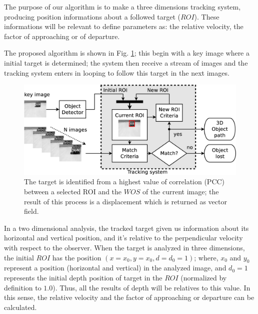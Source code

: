 The purpose of our algorithm is to make a three dimensions tracking system, producing position informations 
about a followed target ($ROI$).
These informations will be relevant to define parameters 
as: the relative velocity, the factor of approaching or of departure.

The proposed algorithm is shown in Fig. \ref{fig:system};
this begin with a key image where a initial target is determined; 
the system then receive a stream of images and the tracking system 
enters in looping to follow this target in the next images.

\begin{figure}[bhp]
\includegraphics[width=\columnwidth]{images/figure1-diagram1.eps}
\caption{The target is identified from a highest value of correlation (PCC) between a selected ROI and 
the $WOS$ of the current image; the result of this process is a displacement which is  returned as vector field.}
\label{fig:system}
\end{figure}

In a two dimensional analysis, the tracked target given us information about its horizontal 
and vertical position, and it's relative to the perpendicular velocity with respect to the observer.
When the target is analyzed in three dimensions, 
the initial $ROI$ has the position $(x=x_0,y=x_0,d=d_0=1)$;
where, $x_0$ and $y_0$ represent a position (horizontal and vertical) in the analyzed image,
and $d_0=1$ represents the initial depth position of target in the $ROI$ (normalized by definition to $1.0$).
Thus, all the results of depth will be relatives to this value. In this sense, the relative velocity and 
the factor of approaching or departure can be calculated.

